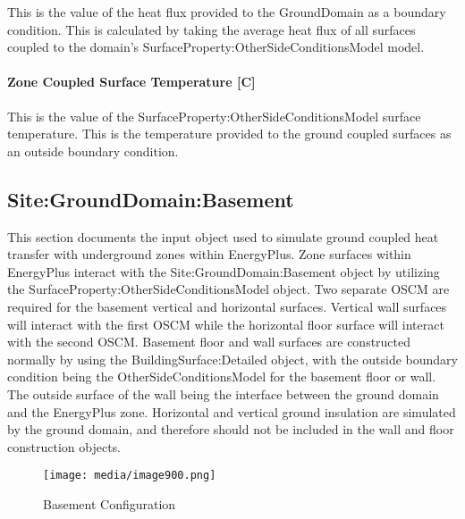 This is the value of the heat flux provided to the GroundDomain as a boundary condition. This is calculated by taking the average heat flux of all surfaces coupled to the domain's SurfaceProperty:OtherSideConditionsModel model.

\paragraph{Zone Coupled Surface Temperature {[}C{]}}\label{zone-coupled-surface-temperature-c}

This is the value of the SurfaceProperty:OtherSideConditionsModel surface temperature. This is the temperature provided to the ground coupled surfaces as an outside boundary condition.

\subsection{Site:GroundDomain:Basement}\label{sitegrounddomainbasement}

This section documents the input object used to simulate ground coupled heat transfer with underground zones within EnergyPlus. Zone surfaces within EnergyPlus interact with the Site:GroundDomain:Basement object by utilizing the SurfaceProperty:OtherSideConditionsModel object. Two separate OSCM are required for the basement vertical and horizontal surfaces. Vertical wall surfaces will interact with the first OSCM while the horizontal floor surface will interact with the second OSCM. Basement floor and wall surfaces are constructed normally by using the BuildingSurface:Detailed object, with the outside boundary condition being the OtherSideConditionsModel for the basement floor or wall. The outside surface of the wall being the interface between the ground domain and the EnergyPlus zone. Horizontal and vertical ground insulation are simulated by the ground domain, and therefore should not be included in the wall and floor construction objects.

\begin{figure}[htbp]
\centering
\texttt{[image: media/image900.png]}
\caption{Basement Configuration \protect \label{fig:basement-configuration}}
\end{figure}

